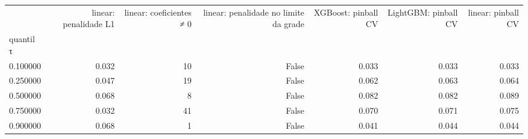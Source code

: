 \begin{tabular}{lrrrrrr}
\toprule
 & linear: penalidade L1 & linear: coeficientes ≠ 0 & linear: penalidade no limite da grade & XGBoost: pinball CV & LightGBM: pinball CV & linear: pinball CV \\
quantil τ &  &  &  &  &  &  \\
\midrule
0.100000 & 0.032 & 10 & False & 0.033 & 0.033 & 0.033 \\
0.250000 & 0.047 & 19 & False & 0.062 & 0.063 & 0.064 \\
0.500000 & 0.068 & 8 & False & 0.082 & 0.082 & 0.089 \\
0.750000 & 0.032 & 41 & False & 0.070 & 0.071 & 0.075 \\
0.900000 & 0.068 & 1 & False & 0.041 & 0.044 & 0.044 \\
\bottomrule
\end{tabular}
